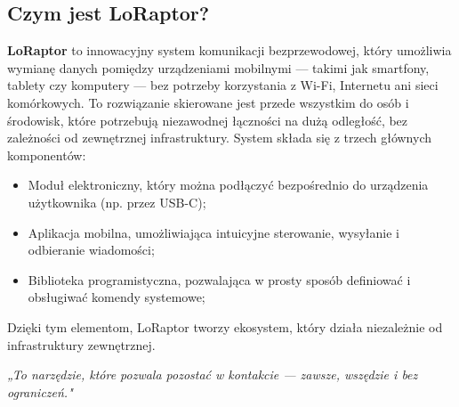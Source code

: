 \subsection{Czym jest LoRaptor?}

\textbf{LoRaptor} to innowacyjny system komunikacji bezprzewodowej, który umożliwia wymianę danych pomiędzy urządzeniami mobilnymi --- takimi jak smartfony, tablety czy komputery --- bez potrzeby korzystania z Wi-Fi, Internetu ani sieci komórkowych. To rozwiązanie skierowane jest przede wszystkim do osób i środowisk, które potrzebują niezawodnej łączności na dużą odległość, bez zależności od zewnętrznej infrastruktury.
System składa się z trzech głównych komponentów:
\begin{itemize}
	\item Moduł elektroniczny, który można podłączyć bezpośrednio do urządzenia użytkownika (np. przez USB-C);
	\item Aplikacja mobilna, umożliwiająca intuicyjne sterowanie, wysyłanie i odbieranie wiadomości;
	\item Biblioteka programistyczna, pozwalająca w prosty sposób definiować i obsługiwać komendy systemowe;
\end{itemize}
Dzięki tym elementom, LoRaptor tworzy ekosystem, który działa niezależnie od infrastruktury zewnętrznej.

\begin{tcolorbox}[
	colback=gray!5!white, 
	colframe=gray!75!black, 
	boxrule=0.8pt, 
	arc=5pt,
	enhanced,
	drop shadow,
	top=8pt,
	bottom=8pt,
	center
]
	\begin{center}
		\emph{„To narzędzie, które pozwala pozostać w kontakcie --- zawsze, wszędzie i bez ograniczeń."}
	\end{center}
\end{tcolorbox}